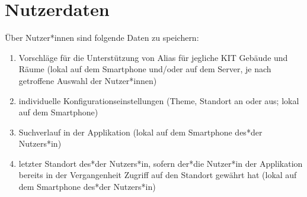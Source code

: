 \section{Nutzerdaten}

Über Nutzer*innen sind folgende Daten zu speichern:
\begin{enumerate}[label=\textbf{/D\arabic*0/}, align=left]
	\item Vorschläge für die Unterstützung von Alias für jegliche KIT Gebäude und Räume (lokal auf dem Smartphone und/oder auf dem Server, je nach getroffene Auswahl der Nutzer*innen)
	\item individuelle Konfigurationseinstellungen (Theme, Standort an oder aus; lokal auf dem Smartphone)
	\item Suchverlauf in der Applikation (lokal auf dem Smartphone des*der Nutzers*in)
	\item letzter Standort des*der Nutzers*in, sofern der*die Nutzer*in der Applikation bereits in der Vergangenheit Zugriff auf den Standort gewährt hat (lokal auf dem Smartphone des*der Nutzers*in)
\end{enumerate}